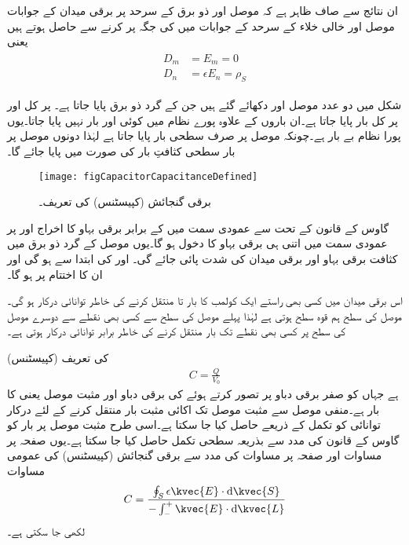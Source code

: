 ان نتائج سے صاف  ظاہر ہے کہ موصل اور ذو برق کے سرحد پر برقی میدان کے جوابات موصل اور خالی خلاء کے سرحد کے جوابات میں  کی جگہ  پر کرنے سے حاصل ہوتے ہیں یعنی
\begin{gather}
\begin{aligned}
D_m&=E_m=0\\
D_n&=\epsilon E_n=\rho_S
\end{aligned}
\end{gather}



شکل  میں دو عدد موصل  اور   دکھائے گئے ہیں جن کے گرد ذو برق پایا جاتا ہے۔ پر کل  اور  پر کل  بار پایا جاتا ہے۔ان باروں کے علاوہ پورے نظام میں کوئی اور بار نہیں پایا جاتا۔یوں پورا نظام بے بار ہے۔چونکہ موصل پر صرف سطحی بار پایا جاتا ہے لہٰذا دونوں موصل پر بار سطحی کثافتِ بار کی صورت میں پایا جائے گا۔

\begin{figure}
\centering
\texttt{[image: figCapacitorCapacitanceDefined]}
\caption{برقی گنجائش (کپیسٹنس) کی تعریف۔}
\label{شکل_کپیسٹر_برقی_کپیسٹنس_کی_تعریف}
\end{figure}

گاوس کے قانون کے تحت  سے عمودی سمت میں  کے برابر برقی بہاو کا اخراج  اور   پر عمودی سمت میں اتنی ہی برقی بہاو کا دخول ہو گا۔یوں موصل کے گرد ذو برق میں کثافت برقی بہاو  اور برقی میدان کی شدت  پائی جائے گی۔ اور  کی ابتدا  سے ہو گی اور ان کا اختتام  پر ہو گا۔

اس برقی میدان میں  کسی بھی راستے  ایک کولمب کا بار  تا  منتقل کرنے کی خاطر  توانائی درکار ہو گی۔موصل کی سطح ہم قوہ سطح ہوتی ہے لہٰذا پہلے موصل کی سطح سے کسی بھی نقطے سے دوسرے  موصل کی سطح پر کسی بھی نقطے تک بار منتقل کرنے کی خاطر برابر توانائی درکار ہوتی ہے۔

 (کپیسٹنس)  کی تعریف
\begin{align}
C=\frac{Q}{V_0}
\end{align}
ہے جہاں  کو صفر برقی دباو پر تصور کرتے ہوئے  کی برقی دباو  اور  مثبت موصل یعنی  کا بار  ہے۔منفی موصل سے مثبت موصل تک اکائی مثبت بار منتقل کرنے کے لئے درکار توانائی  کو تکمل کے ذریعے حاصل کیا جا سکتا ہے۔اسی طرح مثبت موصل پر بار   کو گاوس کے قانون کی مدد سے بذریعہ سطحی تکمل  حاصل  کیا جا سکتا ہے۔یوں صفحہ  پر مساوات  اور صفحہ  پر مساوات  کی مدد سے برقی گنجائش (کپیسٹنس) کی عمومی مساوات
\begin{align}
C=\frac{\oint_S  \epsilon \kvec{E} \cdot \dif \kvec{S} }{-\int_{-}^{+} \kvec{E} \cdot \dif \kvec{L}}
\end{align}
لکھی جا سکتی ہے۔

